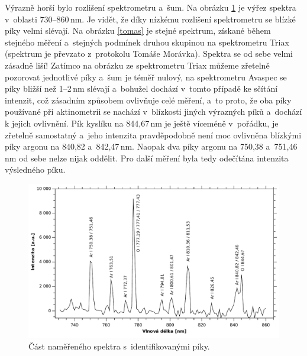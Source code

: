 \documentclass[12pt]{article}
\begin{document}
Výrazně horší bylo rozlišení spektrometru a~šum. Na obrázku \ref{piky} je výřez spektra v~oblasti 730--860\,nm. Je vidět, že díky nízkému rozlišení spektrometru se blízké píky velmi slévají. Na obrázku \ref{tomas} je stejné spektrum, získané během stejného měření a~stejných podmínek druhou skupinou na spektrometru Triax (spektrum je převzato z~protokolu Tomáše Morávka). Spektra se od sebe velmi zásadně liší! Zatímco na obrázku ze spektrometru Triax můžeme zřetelně pozorovat jednotlivé píky a~šum je téměř nulový, na spektrometru Avaspec se píky bližší než 1--2\,nm slévají a~bohužel dochází v~tomto případě ke sčítání intenzit, což zásadním způsobem ovlivňuje celé měření, a~to proto, že oba píky používané při aktinometrii se nachází v~blízkosti jiných výrazných píků a~dochází k jejich ovlivnění. Pík kyslíku na 844,67\,nm je ještě víceméně v~pořádku, je zřetelně samostatný a~jeho intenzita pravděpodobně není moc ovlivněna blízkými píky argonu na 840,82 a~842,47\,nm. Naopak dva píky argonu na 750,38 a~751,46\,nm od sebe nelze nijak oddělit. Pro další měření byla tedy odečítána intenzita výsledného píku.

\begin{figure}[htbp]
\begin{center}
\includegraphics[width=21cm, angle=270]{piky.pdf}
\caption{Část naměřeného spektra s~identifikovanými píky.}
\label{piky}
\end{center}
\end{figure}
\end{document}
